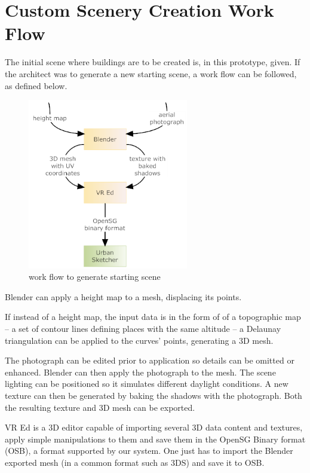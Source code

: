 
\section{Custom Scenery Creation Work Flow}

The initial scene where buildings are to be created is, in this prototype, given.
If the architect was to generate a new starting scene, a work flow can be followed, as defined below.

\begin{figure}[!ht]
		\centering
		\includegraphics[width=7cm]{gfx/scene-work-flow.png}
		\caption{work flow to generate starting scene}
		\label{fig:scene-work-flow}
\end{figure}

Blender can apply a height map to a mesh, displacing its points.

If instead of a height map, the input data is in the form of of a topographic map
-- a set of contour lines defining places with the same altitude --
a Delaunay triangulation can be applied to the curves' points, generating a 3D mesh.

The photograph can be edited prior to application so details can be omitted or enhanced.
Blender can then apply the photograph to the mesh.
The scene lighting can be positioned so it simulates different daylight conditions.
A new texture can then be generated by baking the shadows with the photograph.
Both the resulting texture and 3D mesh can be exported.

VR Ed \cite{VRED} is a 3D editor capable of importing several 3D data content and textures,
apply simple manipulations to them and save them in the OpenSG Binary format (OSB),
a format supported by our system.
One just has to import the Blender exported mesh (in a common format such as 3DS)
and save it to OSB.


